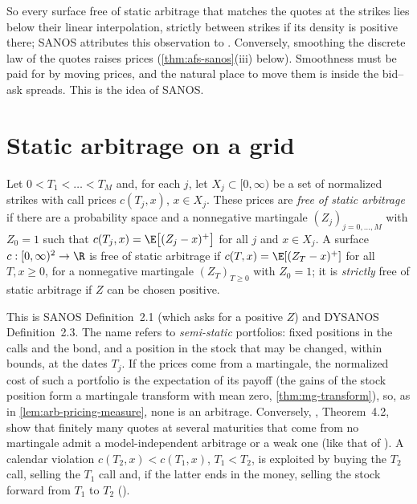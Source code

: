 So every surface free of static arbitrage that matches the quotes at the strikes lies below their linear
interpolation, strictly between strikes if its density is positive there; SANOS attributes this observation to
\textcite{buehler-expensive-2006}. Conversely, smoothing the discrete law of the quotes raises prices
(\cref{thm:afs-sanos}(iii) below). Smoothness must be paid for by moving prices, and the natural place to move
them is inside the bid--ask spreads. This is the idea of SANOS.

\section{Static arbitrage on a grid}\label{sec:afs-grid}

\begin{definition}\label{def:afs-static-arbitrage}
Let $0<T_1<\dots<T_M$ and, for each $j$, let $X_j\subset[0,\infty)$ be a set of normalized strikes with call
prices $c(T_j,x)$, $x\in X_j$. These prices are \emph{free of static arbitrage} if there are a probability space
and a nonnegative martingale $(Z_j)_{j=0,\dots,M}$ with $Z_0=1$ such that
$c(T_j,x)=\E\big[(Z_j-x)^+\big]$ for all $j$ and $x\in X_j$. A surface $c:[0,\infty)^2\to\R$ is free of static
arbitrage if $c(T,x)=\E[(Z_T-x)^+]$ for all $T,x\ge0$, for a nonnegative martingale $(Z_T)_{T\ge0}$ with
$Z_0=1$; it is \emph{strictly} free of static arbitrage if $Z$ can be chosen positive.
\end{definition}

This is SANOS Definition~2.1 (which asks for a positive $Z$) and DYSANOS Definition~2.3. The name refers to
\emph{semi-static} portfolios: fixed positions in the calls and the bond, and a position in the stock that may be
changed, within bounds, at the dates $T_j$. If the prices come from a martingale, the normalized cost of such a
portfolio is the expectation of its payoff (the gains of the stock position form a martingale transform with mean zero,
\cref{thm:mg-transform}), so, as in \cref{lem:arb-pricing-measure}, none is an arbitrage. Conversely, \textcite{davis-hobson}, Theorem~4.2, show
that finitely many quotes at several maturities that come from no martingale admit a model-independent
arbitrage or a weak one (like that of ). A calendar violation $c(T_2,x)<c(T_1,x)$, $T_1<T_2$,
is exploited by buying the $T_2$ call, selling the $T_1$ call and, if the latter ends in the money, selling the stock
forward from $T_1$ to $T_2$ ().

